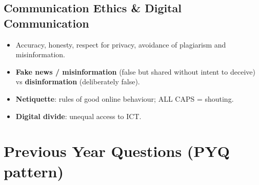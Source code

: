 \needspace{95pt}

\hypertarget{p1-04--75-communication-ethics--digital-communication}{%
\subsection{Communication Ethics \& Digital Communication}\label{p1-04--75-communication-ethics--digital-communication}}

\begin{itemize}
\tightlist
\item
  Accuracy, honesty, respect for privacy, avoidance of plagiarism and misinformation.
\item
  \textbf{Fake news / misinformation} (false but shared without intent to deceive) vs \textbf{disinformation} (deliberately false).
\item
  \textbf{Netiquette}: rules of good online behaviour; ALL CAPS = shouting.
\item
  \textbf{Digital divide}: unequal access to ICT.
\end{itemize}

\needspace{95pt}

\hypertarget{p1-04--previous-year-questions-pyq-pattern}{%
\section{Previous Year Questions (PYQ pattern)}\label{p1-04--previous-year-questions-pyq-pattern}}

